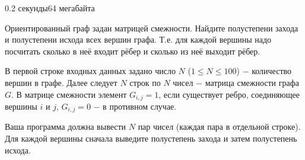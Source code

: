 \begin{problem}{}{}{}{0.2 секунды}{64 мегабайта}

Ориентированный граф задан матрицей смежности. Найдите полустепени захода и полустепени исхода всех вершин графа.
Т.е. для каждой вершины надо посчитать сколько в неё входит рёбер и сколько из неё выходит рёбер.

\InputFile
В первой строке входных данных задано число $N$ ($1 \le N \le 100$) $-$ количество вершин в графе.
Далее следует $N$ строк по $N$ чисел $-$ матрица смежности графа $G$. В матрице смежности элемент $G_{i,j}=1$, если
существует ребро, соединяющее вершины $i$ и $j$, $G_{i,j}=0$ $-$ в противном случае.

\OutputFile
Ваша программа должна вывести $N$ пар чисел (каждая пара в отдельной строке). Для каждой вершины сначала выведите 
полустепень захода и затем полустепень исхода.

\Example

\begin{example}
%
\end{example}

\end{problem}


